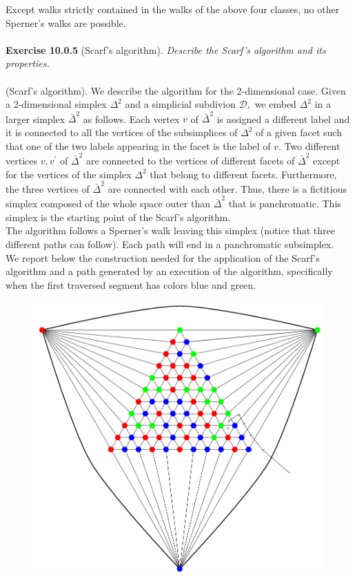 Except walks strictly contained in the walks of the above four classes, no other Sperner’s walks are possible.\\\\
\textbf{Exercise 10.0.5} (Scarf’s algorithm). \textit{Describe the Scarf’s algorithm and its properties.}\\\\
(Scarf's algorithm). We describe the algorithm for the 2-dimensional case. Given a 2-dimensional simplex $\Delta^{2}$ and a simplicial subdivion $\mathcal{D},$ we embed $\Delta^{2}$ in a larger simplex $\bar{\Delta}^{2}$ as follows. Each vertex $v$ of $\bar{\Delta}^{2}$ is assigned a different label and it is connected to all the vertices of the subsimplices of $\Delta^{2}$ of a given facet such that one of the two labels appearing in the facet is the label of $v$. Two different vertices $v, v^{\prime}$ of $\bar{\Delta}^{2}$ are connected to the vertices of different facets of $\bar{\Delta}^{2}$ except for the vertices of the simplex $\Delta^{2}$ that belong to different facets. Furthermore, the three vertices of $\bar{\Delta}^{2}$ are connected with each other. Thus, there is a fictitious simplex composed of the whole space outer than $\bar{\Delta}^{2}$ that is panchromatic. This simplex is the starting point of the Scarf's algorithm.\\
The algorithm follows a Sperner's walk leaving this simplex (notice that three different paths can follow). Each path will end in a panchromatic subsimplex.\\
We report below the construction needed for the application of the Scarf’s algorithm and a path generated by an execution of the algorithm, specifically when the first traversed segment has colors blue and green.
\begin{figure}[H]
\centering
\includegraphics[width=\textwidth]{images/img_2_10_02.png}
\end{figure}
